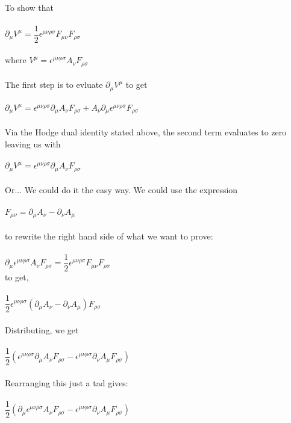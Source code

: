 \documentclass[prb,preprint]
{revtex4-1}
\begin{document}
\\
To show that 
\\
\\
$\partial_\mu V^\mu = \dfrac{1}{2}\epsilon^{\mu\nu\rho\sigma}F_{\mu\nu}F_{\rho\sigma}$
\\
\\
where $V^\mu = \epsilon^{\mu\nu\rho\sigma}A_\nu F_{\rho\sigma}$
\\
\\
The first step is to evluate $\partial_\mu V^\mu$ to get
\\
\\
$\partial_\mu V^\mu = \epsilon^{\mu\nu\rho\sigma}\partial_\mu A_\nu F_{\rho\sigma} + A_\nu \partial_\mu\epsilon^{\mu\nu\rho\sigma} F_{\rho\sigma}$
\\
\\
Via the Hodge dual identity stated above, the second term evaluates to zero leaving us with 
\\
\\
$\partial_\mu V^\mu = \epsilon^{\mu\nu\rho\sigma}\partial_\mu A_\nu F_{\rho\sigma}$
\\
\\
Or... We could do it the easy way.  We could use the expression 
\\
\\
$F_{\mu\nu} = \partial_\mu A_\nu - \partial_\nu A_\mu$ 
\\
\\
to rewrite the right hand side of what we want to prove:
\\
\\
$\partial_\mu \epsilon^{\mu\nu\rho\sigma}A_\nu F_{\rho\sigma} = \dfrac{1}{2}\epsilon^{\mu\nu\rho\sigma}F_{\mu\nu}F_{\rho\sigma}$
\\
to get, 
\\
\\
$\dfrac{1}{2}\epsilon^{\mu\nu\rho\sigma} \left(\partial_\mu A_\nu - \partial_\nu A_\mu\right)F_{\rho\sigma}$
\\
\\
Distributing, we get
\\
\\
$\dfrac{1}{2} \left(\epsilon^{\mu\nu\rho\sigma} \partial_\mu A_\nu F_{\rho\sigma} - \epsilon^{\mu\nu\rho\sigma} \partial_\nu A_\mu F_{\rho\sigma}\right)$
\\
\\
Rearranging this just a tad gives:
\\
\\
$\dfrac{1}{2} \left(\partial_\mu \epsilon^{\mu\nu\rho\sigma}  A_\nu F_{\rho\sigma} - \epsilon^{\mu\nu\rho\sigma} \partial_\nu A_\mu F_{\rho\sigma}\right)$
\end{document}
